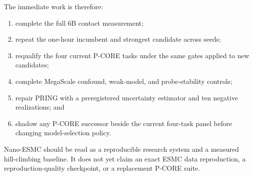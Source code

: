 \documentclass{article}
\begin{document}
The immediate work is therefore:

\begin{enumerate}
  \item complete the full 6B contact measurement;
  \item repeat the one-hour incumbent and strongest candidate across seeds;
  \item requalify the four current P-CORE tasks under the same gates applied
        to new candidates;
  \item complete MegaScale confound, weak-model, and probe-stability controls;
  \item repair PRING with a preregistered uncertainty estimator and ten
        negative realizations; and
  \item shadow any P-CORE successor beside the current four-task panel before
        changing model-selection policy.
\end{enumerate}

Nano-ESMC should be read as a reproducible research system and a measured
hill-climbing baseline. It does not yet claim an exact ESMC data reproduction,
a reproduction-quality checkpoint, or a replacement P-CORE suite.

\begingroup
\footnotesize
\setlength{\bibsep}{1pt}


\endgroup
\end{document}
